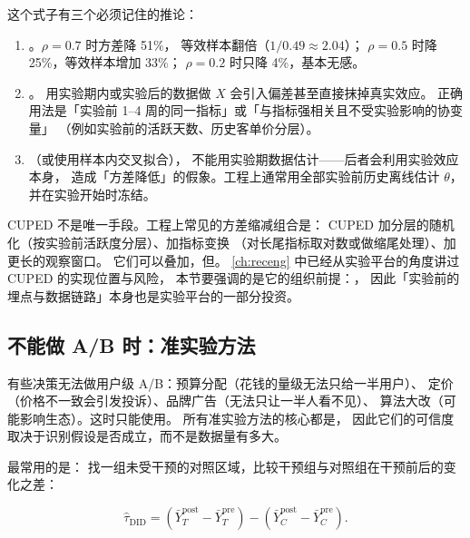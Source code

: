 这个式子有三个必须记住的推论：

\begin{enumerate}
  \item {}。$\rho = 0.7$ 时方差降 51\%，
        等效样本翻倍（$1/0.49 \approx 2.04$）；
        $\rho = 0.5$ 时降 25\%，等效样本增加 33\%；
        $\rho = 0.2$ 时只降 4\%，基本无感。
  \item {}。
        用实验期内或实验后的数据做 $X$ 会引入偏差甚至直接抹掉真实效应。
        正确用法是「实验前 1--4 周的同一指标」或「与指标强相关且不受实验影响的协变量」
        （例如实验前的活跃天数、历史客单价分层）。
  \item {}（或使用样本内交叉拟合），
        不能用实验期数据估计——后者会利用实验效应本身，
        造成「方差降低」的假象。工程上通常用全部实验前历史离线估计 $\theta$，
        并在实验开始时冻结。
\end{enumerate}

CUPED 不是唯一手段。工程上常见的方差缩减组合是：
CUPED 加分层的随机化（按实验前活跃度分层）、加指标变换
（对长尾指标取对数或做缩尾处理）、加更长的观察窗口。
它们可以叠加，但。
\cref{ch:receng} 中已经从实验平台的角度讲过 CUPED 的实现位置与风险，
本节要强调的是它的组织前提：，
因此「实验前的埋点与数据链路」本身也是实验平台的一部分投资。

\subsection{不能做 A/B 时：准实验方法}

有些决策无法做用户级 A/B：预算分配（花钱的量级无法只给一半用户）、
定价（价格不一致会引发投诉）、品牌广告（无法只让一半人看不见）、
算法大改（可能影响生态）。这时只能使用。
所有准实验方法的核心都是，
因此它们的可信度取决于识别假设是否成立，而不是数据量有多大。

最常用的是：
找一组未受干预的对照区域，比较干预组与对照组在干预前后的变化之差：

\begin{equation}
\hat\tau_{\text{DID}} = \left( \bar Y^{\text{post}}_{T} - \bar Y^{\text{pre}}_{T} \right)
- \left( \bar Y^{\text{post}}_{C} - \bar Y^{\text{pre}}_{C} \right) .
\label{eq:growth-did}
\end{equation}

